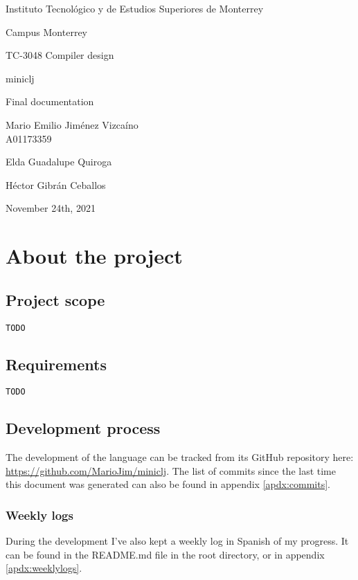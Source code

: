 \documentclass[11pt]{scrreprt}
\begin{document}
\begin{titlepage}
    \centering
    \vspace{4\baselineskip}
    Instituto Tecnológico y de Estudios Superiores de Monterrey\par
    Campus Monterrey\par
    \vspace{2\baselineskip}
    {\large
    TC-3048 Compiler design}\par
    \vspace{6\baselineskip}
    {\huge
    miniclj\par}
    {\LARGE
    Final documentation\par}
    \vspace{4\baselineskip}
    {\Large
    Mario Emilio Jiménez Vizcaíno\\ A01173359\par}
    \vfill
    Elda Guadalupe Quiroga\par
    Héctor Gibrán Ceballos\par
    \vspace{4\baselineskip}
    November 24th, 2021
\end{titlepage}

\pagebreak

\tableofcontents

\chapter{About the project}
\section{Project scope}
\texttt{TODO}

\section{Requirements}
\texttt{TODO}

\section{Development process}
The development of the language can be tracked from its GitHub repository here: \\\url{https://github.com/MarioJim/miniclj}. The list of commits since the last time this document was generated can also be found in appendix \ref{apdx:commits}.

\subsection{Weekly logs}
During the development I've also kept a weekly log in Spanish of my progress. It can be found in the README.md file in the root directory, or in appendix \ref{apdx:weeklylogs}.
\end{document}
